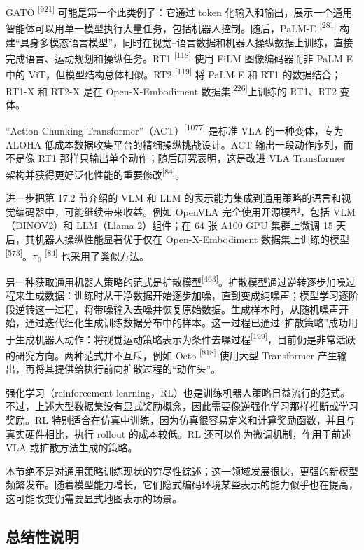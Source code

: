 GATO \textsuperscript{[921]} 可能是第一个此类例子：它通过 token 化输入和输出，展示一个通用智能体可以用单一模型执行大量任务，包括机器人控制。随后，PaLM-E \textsuperscript{[281]} 构建“具身多模态语言模型”，同时在视觉--语言数据和机器人操纵数据上训练，直接完成语言、运动规划和操纵任务。RT1 \textsuperscript{[118]} 使用 FiLM 图像编码器而非 PaLM-E 中的 ViT，但模型结构总体相似。RT2 \textsuperscript{[119]} 将 PaLM-E 和 RT1 的数据结合；RT1-X 和 RT2-X 是在 Open-X-Embodiment 数据集\textsuperscript{[226]}上训练的 RT1、RT2 变体。

“Action Chunking Transformer”（ACT）\textsuperscript{[1077]} 是标准 VLA 的一种变体，专为 ALOHA 低成本数据收集平台的精细操纵挑战设计。ACT 输出一段动作序列，而不是像 RT1 那样只输出单个动作；随后研究表明，这是改进 VLA Transformer 架构并获得更好泛化性能的重要修改\textsuperscript{[84]}。

进一步把第 17.2 节介绍的 VLM 和 LLM 的表示能力集成到通用策略的语言和视觉编码器中，可能继续带来收益。例如 OpenVLA 完全使用开源模型，包括 VLM（DINOV2）和 LLM（Llama 2）组件；在 64 张 A100 GPU 集群上微调 15 天后，其机器人操纵性能显著优于仅在 Open-X-Embodiment 数据集上训练的模型\textsuperscript{[573]}。$\pi_0$ \textsuperscript{[84]} 也采用了类似方法。

另一种获取通用机器人策略的范式是扩散模型\textsuperscript{[463]}。扩散模型通过逆转逐步加噪过程来生成数据：训练时从干净数据开始逐步加噪，直到变成纯噪声；模型学习逐阶段逆转这一过程，将带噪输入去噪并恢复原始数据。生成样本时，从随机噪声开始，通过迭代细化生成训练数据分布中的样本。这一过程已通过“扩散策略”成功用于生成机器人动作：将视觉运动策略表示为条件去噪过程\textsuperscript{[199]}，目前仍是非常活跃的研究方向。两种范式并不互斥，例如 Octo \textsuperscript{[818]} 使用大型 Transformer 产生输出，再将其提供给执行前向扩散过程的“动作头”。

强化学习（reinforcement learning，RL）也是训练机器人策略日益流行的范式。不过，上述大型数据集没有显式奖励概念，因此需要像逆强化学习那样推断或学习奖励。RL 特别适合在仿真中训练，因为仿真很容易定义和计算奖励函数，并且与真实硬件相比，执行 rollout 的成本较低。RL 还可以作为微调机制，作用于前述 VLA 或扩散方法生成的策略。

本节绝不是对通用策略训练现状的穷尽性综述；这一领域发展很快，更强的新模型频繁发布。随着模型能力增长，它们隐式编码环境某些表示的能力似乎也在提高，这可能改变仍需要显式地图表示的场景。

\subsection{总结性说明}

